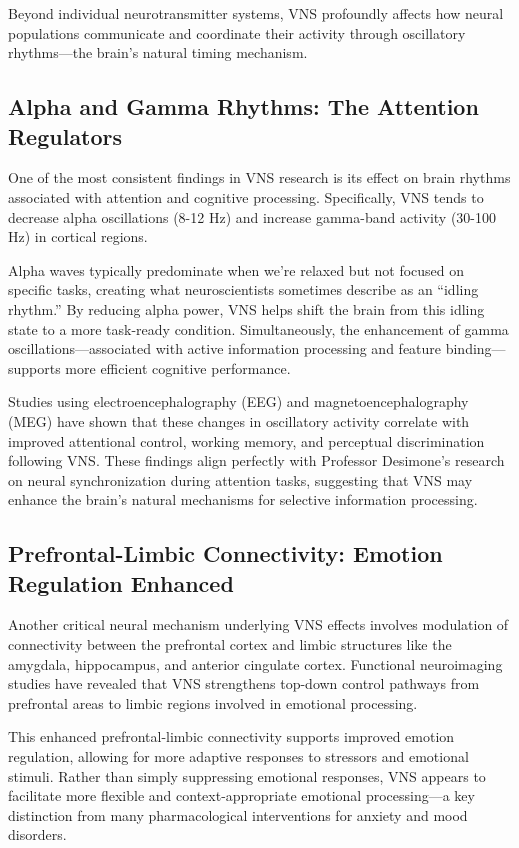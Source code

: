 \documentclass[
  Letterpaper,
]{scrbook}
\begin{document}
Beyond individual neurotransmitter systems, VNS profoundly affects how
neural populations communicate and coordinate their activity through
oscillatory rhythms---the brain's natural timing mechanism.

\subsection{Alpha and Gamma Rhythms: The Attention
Regulators}\label{alpha-and-gamma-rhythms-the-attention-regulators}

One of the most consistent findings in VNS research is its effect on
brain rhythms associated with attention and cognitive processing.
Specifically, VNS tends to decrease alpha oscillations (8-12 Hz) and
increase gamma-band activity (30-100 Hz) in cortical regions.

Alpha waves typically predominate when we're relaxed but not focused on
specific tasks, creating what neuroscientists sometimes describe as an
``idling rhythm.'' By reducing alpha power, VNS helps shift the brain
from this idling state to a more task-ready condition. Simultaneously,
the enhancement of gamma oscillations---associated with active
information processing and feature binding---supports more efficient
cognitive performance.

Studies using electroencephalography (EEG) and magnetoencephalography
(MEG) have shown that these changes in oscillatory activity correlate
with improved attentional control, working memory, and perceptual
discrimination following VNS. These findings align perfectly with
Professor Desimone's research on neural synchronization during attention
tasks, suggesting that VNS may enhance the brain's natural mechanisms
for selective information processing.

\subsection{Prefrontal-Limbic Connectivity: Emotion Regulation
Enhanced}\label{prefrontal-limbic-connectivity-emotion-regulation-enhanced}

Another critical neural mechanism underlying VNS effects involves
modulation of connectivity between the prefrontal cortex and limbic
structures like the amygdala, hippocampus, and anterior cingulate
cortex. Functional neuroimaging studies have revealed that VNS
strengthens top-down control pathways from prefrontal areas to limbic
regions involved in emotional processing.

This enhanced prefrontal-limbic connectivity supports improved emotion
regulation, allowing for more adaptive responses to stressors and
emotional stimuli. Rather than simply suppressing emotional responses,
VNS appears to facilitate more flexible and context-appropriate
emotional processing---a key distinction from many pharmacological
interventions for anxiety and mood disorders.
\end{document}
